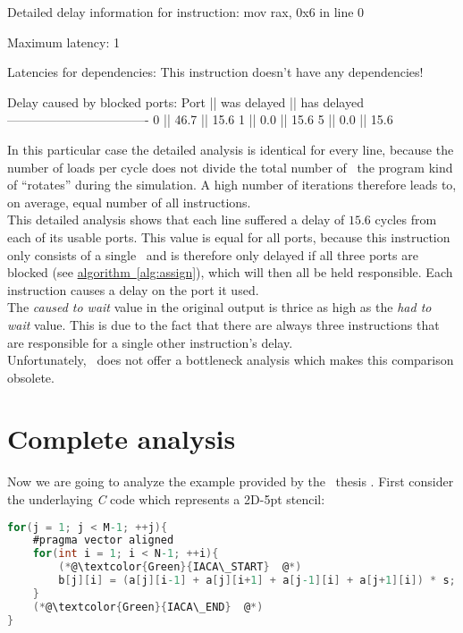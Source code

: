 \begin{example}
Detailed delay information for instruction: mov rax, 0x6 in line 0
    
            Maximum latency: 1
            
            Latencies for dependencies:
            This instruction doesn't have any dependencies!
                      
            Delay caused by blocked ports:
             Port || was delayed || has delayed
             ----------------------------------
              0   ||    46.7     ||    15.6
              1   ||     0.0     ||    15.6
              5   ||     0.0     ||    15.6
\end{example}

In this particular case the detailed analysis is identical for every line, because the number of loads per cycle does not divide the total number of \microops\ the program kind of ``rotates'' during the simulation. A high number of iterations therefore leads to, on average, equal number of all instructions.\\
This detailed analysis shows that each line suffered a delay of $15.6$ cycles from each of its usable ports. This value is equal for all ports, because this instruction only consists of a single \microop\ and is therefore only delayed if all three ports are blocked (see \hyperref[alg:assign]{algorithm~\ref*{alg:assign}}), which will then all be held responsible. Each instruction causes a delay on the port it used.\\
The \emph{caused to wait} value in the original output is thrice as high as the \emph{had to wait} value. This is due to the fact that there are always three instructions that are responsible for a single other instruction's delay.\\

Unfortunately, \osaca\ does not offer a bottleneck analysis which makes this comparison obsolete.


\section{Complete analysis}

Now we are going to analyze the example provided by the \osaca\ thesis \cite{osaca-thesis}. First consider the underlaying \emph{C} code which represents a 2D-5pt stencil:


\begin{mdframed}[backgroundcolor=light-gray, roundcorner=10pt,leftmargin=1, rightmargin=1, innerleftmargin=15, innertopmargin=1,innerbottommargin=1, outerlinewidth=1, linecolor=light-gray]
    \begin{lstlisting}[language=C, basicstyle=\scriptsize]
for(j = 1; j < M-1; ++j){
    #pragma vector aligned
    for(int i = 1; i < N-1; ++i){
        (*@\textcolor{Green}{IACA\_START}  @*)
        b[j][i] = (a[j][i-1] + a[j][i+1] + a[j-1][i] + a[j+1][i]) * s;
    }
    (*@\textcolor{Green}{IACA\_END}  @*)
}
    \end{lstlisting}
\end{mdframed}

